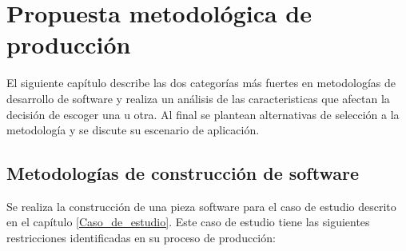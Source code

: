 
\chapter{Propuesta metodológica de producción}
\label{capitulometodologia}

El siguiente capítulo describe las dos categorías más fuertes en metodologías de desarrollo de software y realiza un análisis de las caracteristicas que afectan la decisión de escoger una u otra. Al final se plantean alternativas de selección a la metodología y se discute su escenario de aplicación.

\section{Metodologías de construcción de software}

Se realiza la construcción de una pieza software para el caso de estudio descrito en el capítulo \ref{Caso_de_estudio}. Este caso de estudio tiene las siguientes restricciones identificadas en su proceso de producción:

